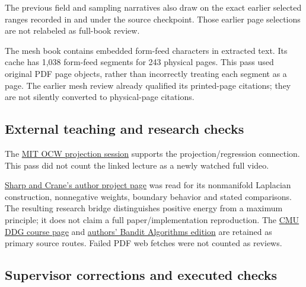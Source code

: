 The previous field and sampling narratives also draw on the exact earlier selected ranges recorded in  and  under the source checkpoint. Those earlier page selections are not relabeled as full-book review.

The mesh book contains embedded form-feed characters in extracted text. Its cache has 1,038 form-feed segments for 243 physical pages. This pass used original PDF page objects, rather than incorrectly treating each segment as a page. The earlier mesh review already qualified its printed-page citations; they are not silently converted to physical-page citations.

\subsection{External teaching and research checks}\label{appendix-5056f3debc1f-external-teaching-and-research-checks}

\hypertarget{appendix-5056f3debc1f-external-teaching-and-research-checks}{}

The \href{https://www.ocw.mit.edu/courses/18-06sc-linear-algebra-fall-2011/pages/least-squares-determinants-and-eigenvalues/projection-matrices-and-least-squares/}{MIT OCW projection session} supports the projection/regression connection. This pass did not count the linked lecture as a newly watched full video.

\href{https://www.cs.cmu.edu/~kmcrane/Projects/NonmanifoldLaplace/index.html}{Sharp and Crane's author project page} was read for its nonmanifold Laplacian construction, nonnegative weights, boundary behavior and stated comparisons. The resulting research bridge distinguishes positive energy from a maximum principle; it does not claim a full paper/implementation reproduction. The \href{https://www.cs.cmu.edu/~kmcrane/Projects/DGPDEC/index.html}{CMU DDG course page} and \href{https://tor-lattimore.com/downloads/book/book.pdf}{authors' Bandit Algorithms edition} are retained as primary source routes. Failed PDF web fetches were not counted as reviews.

\subsection{Supervisor corrections and executed checks}\label{appendix-5056f3debc1f-supervisor-corrections-and-executed-checks}

